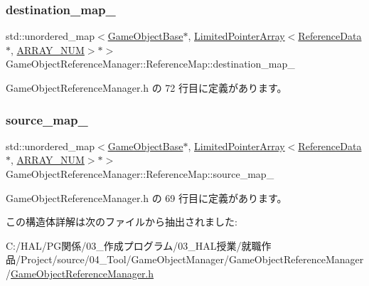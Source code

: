 \subsubsection{\texorpdfstring{destination\+\_\+map\+\_\+}{destination\_map\_}}
{\footnotesize\ttfamily std\+::unordered\+\_\+map$<$\mbox{\hyperlink{class_game_object_base}{Game\+Object\+Base}}$\ast$, \mbox{\hyperlink{class_limited_pointer_array}{Limited\+Pointer\+Array}}$<$\mbox{\hyperlink{struct_game_object_reference_manager_1_1_reference_data}{Reference\+Data}}$\ast$, \mbox{\hyperlink{class_game_object_reference_manager_a962d30b10c5b76353645773b2c1740ce}{A\+R\+R\+A\+Y\+\_\+\+N\+UM}}$>$$\ast$$>$ Game\+Object\+Reference\+Manager\+::\+Reference\+Map\+::destination\+\_\+map\+\_\+}



 Game\+Object\+Reference\+Manager.\+h の 72 行目に定義があります。

\mbox{\label{struct_game_object_reference_manager_1_1_reference_map_a971b47dd8f37ba3739ce65a6dfe097ff}} 
\subsubsection{\texorpdfstring{source\+\_\+map\+\_\+}{source\_map\_}}
{\footnotesize\ttfamily std\+::unordered\+\_\+map$<$\mbox{\hyperlink{class_game_object_base}{Game\+Object\+Base}}$\ast$, \mbox{\hyperlink{class_limited_pointer_array}{Limited\+Pointer\+Array}}$<$\mbox{\hyperlink{struct_game_object_reference_manager_1_1_reference_data}{Reference\+Data}}$\ast$, \mbox{\hyperlink{class_game_object_reference_manager_a962d30b10c5b76353645773b2c1740ce}{A\+R\+R\+A\+Y\+\_\+\+N\+UM}}$>$$\ast$$>$ Game\+Object\+Reference\+Manager\+::\+Reference\+Map\+::source\+\_\+map\+\_\+}



 Game\+Object\+Reference\+Manager.\+h の 69 行目に定義があります。



この構造体詳解は次のファイルから抽出されました\+:\begin{DoxyCompactItemize}
\item 
C\+:/\+H\+A\+L/\+P\+G関係/03\+\_\+作成プログラム/03\+\_\+\+H\+A\+L授業/就職作品/\+Project/source/04\+\_\+\+Tool/\+Game\+Object\+Manager/\+Game\+Object\+Reference\+Manager/\mbox{\hyperlink{_game_object_reference_manager_8h}{Game\+Object\+Reference\+Manager.\+h}}\end{DoxyCompactItemize}
